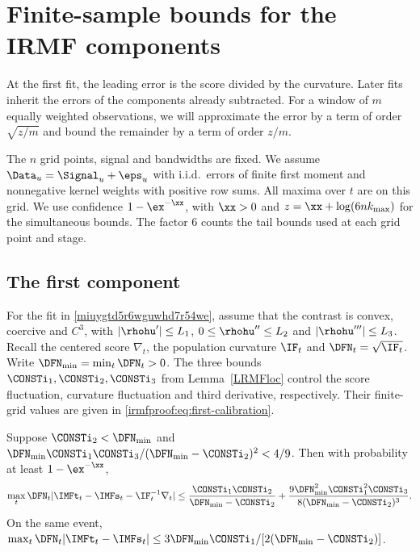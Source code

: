 \section{Finite-sample bounds for the IRMF components}\label{irmfproof:section}

At the first fit, the leading error is the score divided by the curvature.
Later fits inherit the errors of the components already subtracted. For a window of \(m\) equally weighted observations, we will approximate
the error by a term of order \(\sqrt{z/m}\) and bound the remainder by a term
of order \(z/m\).

The \(n\) grid points, signal and bandwidths are fixed.
We assume \(\Data_u=\Signal_u+\eps_u\) with i.i.d.\ errors of finite first
moment and nonnegative kernel weights with positive row sums. All maxima over
\(t\) are on this grid. We use confidence \(1-\ex^{-\xx}\), with \(\xx>0\)
and \(z=\xx+\log(6n k_{\max})\) for the simultaneous bounds.
The factor \(6\) counts the tail bounds used at each grid point and stage.

\subsection{The first component}\label{irmfproof:first}

For the fit in \eqref{miuygtd5r6wguwhd7r54we}, assume that the contrast is
convex, coercive and \(C^3\), with \(|\rhohu'|\le L_1\),
\(0\le\rhohu''\le L_2\) and \(|\rhohu'''|\le L_3\).
Recall the centered score \(\nabla_t\), the population curvature \(\IF_t\)
and \(\DFN_t=\sqrt{\IF_t}\). Write \(\DFN_{\min}=\min_t\DFN_t>0\).
The three bounds \(\CONSTi_1,\CONSTi_2,\CONSTi_3\) from
Lemma~\ref{LRMFloc} control the score fluctuation, curvature fluctuation
and third derivative, respectively. Their finite-grid values are given
in \eqref{irmfproof:eq:first-calibration}.

\begin{proposition}\label{irmfproof:first-bound}
Suppose \(\CONSTi_2<\DFN_{\min}\) and
\(\DFN_{\min}\CONSTi_1\CONSTi_3/(\DFN_{\min}-\CONSTi_2)^2<4/9\).
Then with probability at least \(1-\ex^{-\xx}\),
\begin{equation}\label{irmfproof:first-expansion}
 \max_t\DFN_t|\IMFt_t-\IMFs_t-\IF_t^{-1}\nabla_t|
 \le \frac{\CONSTi_1\CONSTi_2}{\DFN_{\min}-\CONSTi_2}
      +\frac{9\DFN_{\min}^2\CONSTi_1^2\CONSTi_3}{8(\DFN_{\min}-\CONSTi_2)^3} .
\end{equation}
On the same event,
\(\max_t\DFN_t|\IMFt_t-\IMFs_t|\le 3\DFN_{\min}\CONSTi_1/[2(\DFN_{\min}-\CONSTi_2)]\).
\end{proposition}

